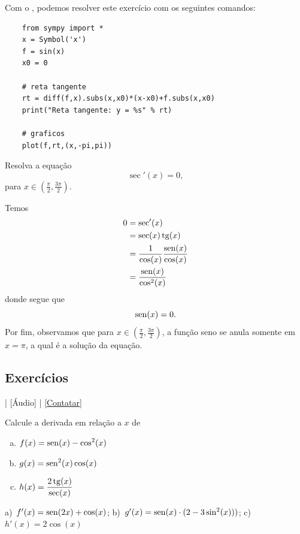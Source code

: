 \begin{resol}
  \ifispython
  Com o \sympy, podemos resolver este exercício com os seguintes comandos:
  \begin{lstlisting}
    from sympy import *
    x = Symbol('x')
    f = sin(x)
    x0 = 0

    # reta tangente
    rt = diff(f,x).subs(x,x0)*(x-x0)+f.subs(x,x0)
    print("Reta tangente: y = %s" % rt)

    # graficos
    plot(f,rt,(x,-pi,pi))
  \end{lstlisting}
  \fi  
\end{resol}

\begin{exeresol}
  Resolva a equação
  \begin{equation}
    \sec'(x) = 0,
  \end{equation}
  para $x\in \left(\frac{\pi}{2}, \frac{3\pi}{2}\right)$.
\end{exeresol}
\begin{resol}
  Temos
  \begin{align}
    0 &= \sec'(x) \\
      &= \sec(x)\operatorname{tg}(x) \\
      &= \frac{1}{\cos(x)}\frac{\operatorname{sen}(x)}{\cos(x)} \\
      &= \frac{\operatorname{sen}(x)}{\cos^2(x)}
  \end{align}
  donde segue que
  \begin{equation}
    \operatorname{sen}(x) = 0.
  \end{equation}
  Por fim, observamos que para $x\in \left(\frac{\pi}{2}, \frac{3\pi}{2}\right)$, a função seno se anula somente em $x=\pi$, a qual é a solução da equação.
\end{resol}


\subsection*{Exercícios}

\begin{flushright}
  [Vídeo] | [Áudio] | \href{https://phkonzen.github.io/notas/contato.html}{[Contatar]}
\end{flushright}

\begin{exer}
  Calcule a derivada em relação a $x$ de
  \begin{enumerate}[a)]
  \item $\displaystyle f(x)=\operatorname{sen}(x)-\cos^2(x)$
  \item $\displaystyle g(x)=\operatorname{sen}^2(x)\cos(x)$
  \item $\displaystyle h(x)=\frac{2\operatorname{tg}(x)}{\sec(x)}$
  \end{enumerate}
\end{exer}
\begin{resp}
  a)~$f'(x)=\operatorname{sen}(2x)+\cos(x)$; b)~$g'(x)=\operatorname{sen}(x)\cdot(2-3\sin^2(x)))$; c)~$h'(x)=2\cos(x)$
\end{resp}

